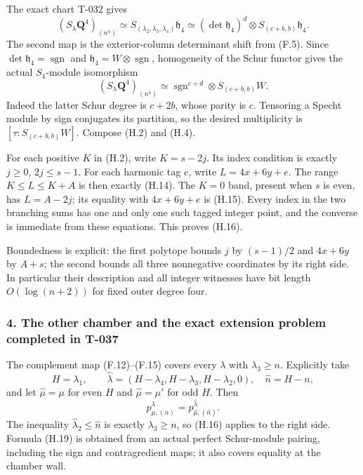\documentclass[
  10pt,
]{article}
\begin{document}
The exact chart T-032 gives \[
(S_\lambda\mathbf Q^4)_{(n^4)}
\simeq S_{(\lambda_2,\lambda_3,\lambda_4)}\mathfrak h_4
\simeq(\det\mathfrak h_4)^d\otimes S_{(c+b,b)}\mathfrak h_4.
\tag{H.17}
\] The second map is the exterior-column determinant shift from (F.5).
Since \(\det\mathfrak h_4=\operatorname{sgn}\) and
\(\mathfrak h_4=W\otimes\operatorname{sgn}\), homogeneity of the Schur
functor gives the actual \(S_4\)-module isomorphism \[
(S_\lambda\mathbf Q^4)_{(n^4)}
\simeq \operatorname{sgn}^{c+d}\otimes S_{(c+b,b)}W.
\tag{H.18}
\] Indeed the latter Schur degree is \(c+2b\), whose parity is \(c\).
Tensoring a Specht module by sign conjugates its partition, so the
desired multiplicity is \([\tau:S_{(c+b,b)}W]\). Compose (H.2) and
(H.4).

For each positive \(K\) in (H.2), write \(K=s-2j\). Its index condition
is exactly \(j\ge0\), \(2j\le s-1\). For each harmonic tag \(e\), write
\(L=4x+6y+e\). The range \(K\le L\le K+A\) is then exactly (H.14). The
\(K=0\) band, present when \(s\) is even, has \(L=A-2j\); its equality
with \(4x+6y+e\) is (H.15). Every index in the two branching sums has
one and only one such tagged integer point, and the converse is
immediate from these equations. This proves (H.16).

Boundedness is explicit: the first polytope bounds \(j\) by \((s-1)/2\)
and \(4x+6y\) by \(A+s\); the second bounds all three nonnegative
coordinates by its right side. In particular their description and all
integer witnesses have bit length \(O(\log(n+2))\) for fixed outer
degree four.

\subsubsection{4. The other chamber and the exact extension problem
completed in
T-037}\label{the-other-chamber-and-the-exact-extension-problem-completed-in-t-037}

The complement map (F.12)--(F.15) covers every \(\lambda\) with
\(\lambda_3\ge n\). Explicitly take \[
H=\lambda_1,\qquad
\widehat\lambda=(H-\lambda_4,H-\lambda_3,H-\lambda_2,0),
\quad\widehat n=H-n,
\] and let \(\widehat\mu=\mu\) for even \(H\) and \(\widehat\mu=\mu'\)
for odd \(H\). Then \[
p_{\mu,(n)}^\lambda
=p_{\widehat\mu,(\widehat n)}^{\widehat\lambda}.
\tag{H.19}
\] The inequality \(\widehat\lambda_2\le\widehat n\) is exactly
\(\lambda_3\ge n\), so (H.16) applies to the right side. Formula (H.19)
is obtained from an actual perfect Schur-module pairing, including the
sign and contragredient maps; it also covers equality at the chamber
wall.
\end{document}
